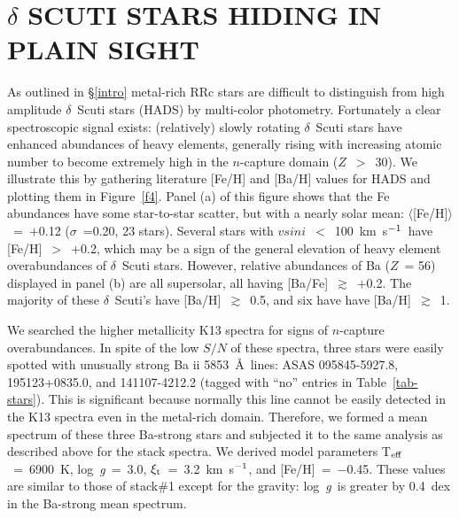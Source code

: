 \documentclass[preprint]{aastex6}
\newcommand\species[2]{#1 {\sc #2}}
\def\teff{\mbox{T$_{\rm eff}$}}
\def\logg{\mbox{log~{\it g}}}
\def\vmicro{\mbox{$\xi_{\rm t}$}}
\def\kmsec{\mbox{km~s$^{\rm -1}$}}
\begin{document}
\section{$\delta$ SCUTI STARS HIDING IN PLAIN SIGHT}\label{delscuti}

As outlined in \S\ref{intro} metal-rich RRc stars are 
difficult to distinguish from high amplitude $\delta$~Scuti stars (HADS) 
by multi-color photometry. 
Fortunately a clear spectroscopic signal exists: (relatively) slowly
rotating $\delta$~Scuti stars have enhanced abundances of heavy elements, 
generally rising with increasing atomic number to become extremely high in the 
$n$-capture domain ($Z$~$>$~30).
We illustrate this by gathering literature [Fe/H] and [Ba/H] 
values for HADS and plotting them in Figure~\ref{f4}.
Panel (a) of this figure shows that the Fe abundances have some star-to-star
scatter, but with a nearly solar mean:  $\langle$[Fe/H]$\rangle$~=~$+$0.12 
($\sigma$~=0.20, 23 stars).
Several stars with $v sin i$~$<$~100~\kmsec\ have [Fe/H]~$>$~$+$0.2,
which may be a sign of the general elevation of heavy element overabundances
of $\delta$~Scuti stars.  
However, relative abundances of Ba ($Z$~= 56) displayed in 
panel (b) are all supersolar, all having [Ba/Fe]~$\gtrsim$~$+$0.2.
The majority of these $\delta$~Scuti's have [Ba/H]~$\gtrsim$~0.5, and six have 
have [Ba/H]~$\gtrsim$~1.  

We searched the higher metallicity K13 spectra for signs of $n$-capture
overabundances.
In spite of the low $S/N$ of these spectra, three stars were easily spotted
with unusually strong \species{Ba}{ii} 5853~\AA\ lines:  ASAS
095845-5927.8, 195123+0835.0, and 141107-4212.2 (tagged with ``no'' 
entries in Table~\ref{tab-stars}).
This is significant because normally this line cannot be easily detected 
in the K13 spectra even in the metal-rich domain.
Therefore, we formed a mean spectrum of these three Ba-strong stars and 
subjected it to the same analysis as described above for the stack spectra.
We derived model parameters \teff~=~6900~K, \logg~=~3.0, 
\vmicro~=~3.2~\kmsec, and [Fe/H]~=~$-$0.45.
These values are similar to those of stack\#1 except for the gravity:
\logg\ is greater by 0.4~dex in the Ba-strong mean spectrum.
\end{document}
